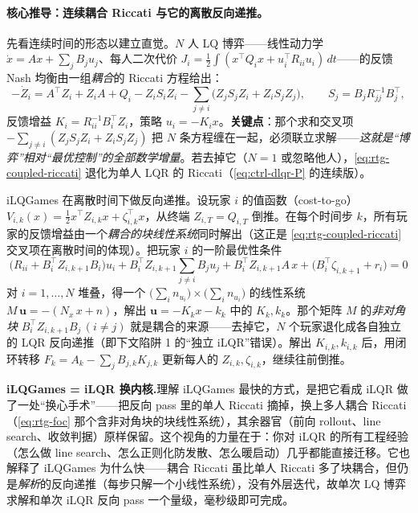 \paragraph{核心推导：连续耦合 Riccati 与它的离散反向递推。}
先看连续时间的形态以建立直觉。$N$ 人 LQ 博弈——线性动力学 $\dot x=Ax+\sum_j B_ju_j$、每人二次代价 $J_i=\tfrac12\int(x^\top Q_ix+u_i^\top R_{ii}u_i)\,dt$——的反馈 Nash 均衡由一组\emph{耦合}的 Riccati 方程给出\cite{basar1999dynamic}：
\begin{equation}
  -\dot Z_i=A^\top Z_i+Z_iA+Q_i-Z_iS_iZ_i-\sum_{j\ne i}\big(Z_jS_jZ_i+Z_iS_jZ_j\big),\qquad S_j=B_jR_{jj}^{-1}B_j^\top,
  \label{eq:rtg-coupled-riccati}
\end{equation}
反馈增益 $K_i=R_{ii}^{-1}B_i^\top Z_i$，策略 $u_i=-K_ix$。\textbf{关键点}：那个求和交叉项 $-\sum_{j\ne i}(Z_jS_jZ_i+Z_iS_jZ_j)$ 把 $N$ 条方程缠在一起，必须联立求解——\emph{这就是“博弈”相对“最优控制”的全部数学增量}。若去掉它（$N=1$ 或忽略他人），\cref{eq:rtg-coupled-riccati} 退化为单人 LQR 的 Riccati（\cref{eq:ctrl-dlqr-P} 的连续版）。

iLQGames 在离散时间下做反向递推。设玩家 $i$ 的值函数（cost-to-go）$V_{i,k}(x)=\tfrac12 x^\top Z_{i,k}x+\zeta_{i,k}^\top x$，从终端 $Z_{i,T}=Q_{i,T}$ 倒推。在每个时间步 $k$，所有玩家的反馈增益由一个\emph{耦合的块线性系统}同时解出（这正是 \cref{eq:rtg-coupled-riccati} 交叉项在离散时间的体现）。把玩家 $i$ 的一阶最优性条件
\begin{equation}
  \big(R_{ii}+B_i^\top Z_{i,k+1}B_i\big)u_i+B_i^\top Z_{i,k+1}\sum_{j\ne i}B_ju_j+B_i^\top Z_{i,k+1}A\,x+\big(B_i^\top\zeta_{i,k+1}+r_i\big)=0
  \label{eq:rtg-foc}
\end{equation}
对 $i=1,\dots,N$ 堆叠，得一个 $\big(\sum_i n_{u_i}\big)\times\big(\sum_i n_{u_i}\big)$ 的线性系统 $M\,\mathbf{u}=-(N_x\,x+n)$，解出 $\mathbf{u}=-K_k x-k_k$ 中的 $K_k,k_k$。那个矩阵 $M$ 的\emph{非对角块} $B_i^\top Z_{i,k+1}B_j\,(i\ne j)$ 就是耦合的来源——去掉它，$N$ 个玩家退化成各自独立的 LQR 反向递推（即下文陷阱 1 的“独立 iLQR”错误）。解出 $K_{i,k},k_{i,k}$ 后，用闭环转移 $F_k=A_k-\sum_j B_{j,k}K_{j,k}$ 更新每人的 $Z_{i,k},\zeta_{i,k}$，继续往前倒推。

\begin{insight}
\textbf{iLQGames = iLQR 换内核.}\;理解 iLQGames 最快的方式，是把它看成 iLQR 做了一处“换心手术”——把反向 pass 里的单人 Riccati 摘掉，换上多人耦合 Riccati（\cref{eq:rtg-foc} 那个含非对角块的块线性系统），其余器官（前向 rollout、line search、收敛判据）原样保留。这个视角的力量在于：你对 iLQR 的所有工程经验（怎么做 line search、怎么正则化防发散、怎么暖启动）几乎都能直接迁移。它也解释了 iLQGames 为什么快——耦合 Riccati 虽比单人 Riccati 多了块耦合，但仍是\emph{解析}的反向递推（每步只解一个小线性系统），没有外层迭代，故单次 LQ 博弈求解和单次 iLQR 反向 pass 一个量级，毫秒级即可完成。
\end{insight}

